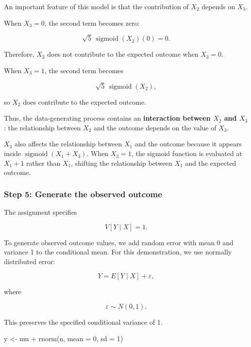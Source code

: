 \documentclass[
  letterpaper,
  DIV=11,
  numbers=noendperiod]{scrreprt}
\newenvironment{Shaded}{\begin{snugshade}}{\end{snugshade}}
\newcommand{\AttributeTok}[1]{\textcolor[rgb]{0.40,0.45,0.13}{#1}}
\newcommand{\DecValTok}[1]{\textcolor[rgb]{0.68,0.00,0.00}{#1}}
\newcommand{\FunctionTok}[1]{\textcolor[rgb]{0.28,0.35,0.67}{#1}}
\newcommand{\NormalTok}[1]{\textcolor[rgb]{0.00,0.23,0.31}{#1}}
\newcommand{\OtherTok}[1]{\textcolor[rgb]{0.00,0.23,0.31}{#1}}
\newcommand{\SpecialCharTok}[1]{\textcolor[rgb]{0.37,0.37,0.37}{#1}}
\begin{document}
An important feature of this model is that the contribution of \(X_2\)
depends on \(X_3\).

When \(X_3 = 0\), the second term becomes zero:

\[
\sqrt{5}\,\operatorname{sigmoid}(X_2)(0) = 0.
\]

Therefore, \(X_2\) does not contribute to the expected outcome when
\(X_3 = 0\).

When \(X_3 = 1\), the second term becomes

\[
\sqrt{5}\,\operatorname{sigmoid}(X_2),
\]

so \(X_2\) does contribute to the expected outcome.

Thus, the data-generating process contains an \textbf{interaction
between \(X_2\) and \(X_3\)}: the relationship between \(X_2\) and the
outcome depends on the value of \(X_3\).

\(X_3\) also affects the relationship between \(X_1\) and the outcome
because it appears inside \(\operatorname{sigmoid}(X_1 + X_3)\). When
\(X_3 = 1\), the sigmoid function is evaluated at \(X_1 + 1\) rather
than \(X_1\), shifting the relationship between \(X_1\) and the expected
outcome.

\subsubsection{Step 5: Generate the observed
outcome}\label{step-5-generate-the-observed-outcome}

The assignment specifies

\[
V[Y \mid X] = 1.
\]

To generate observed outcome values, we add random error with mean 0 and
variance 1 to the conditional mean. For this demonstration, we use
normally distributed error:

\[
Y = E[Y \mid X] + \varepsilon,
\]

where

\[
\varepsilon \sim N(0,1).
\]

This preserves the specified conditional variance of 1.

\begin{Shaded}
\begin{Highlighting}[]
\NormalTok{y }\OtherTok{\textless{}{-}}\NormalTok{ mu }\SpecialCharTok{+} \FunctionTok{rnorm}\NormalTok{(n, }\AttributeTok{mean =} \DecValTok{0}\NormalTok{, }\AttributeTok{sd =} \DecValTok{1}\NormalTok{)}
\end{Highlighting}
\end{Shaded}
\end{document}
